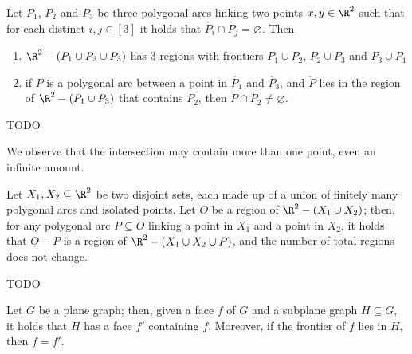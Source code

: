 \documentclass[a4paper, 12pt]{report}
\begin{document}
    \begin{framedlem}[label={3 poly arcs lemma}]{}
        Let $P_1$, $P_2$ and $P_3$ be three polygonal arcs linking two points $x, y \in \R^2$ such that for each distinct $i, j \in [3]$ it holds that $\mathring{P_i} \cap \mathring{P_j} = \varnothing$. Then
        
        \begin{enumerate}
            \item $\R^2 - (P_1 \cup P_2 \cup P_3)$ has 3 regions with frontiers $P_1 \cup P_2$, $P_2 \cup P_3$ and $P_3 \cup P_1$
            \item if $P$ is a polygonal arc between a point in $\mathring{P_1}$ and $\mathring{P_3}$, and $\mathring P$ lies in the region of $\R^2 - (P_1 \cup P_3)$ that contains $\mathring{P_2}$, then $\mathring{P} \cap \mathring{P_2} \neq \varnothing$.
        \end{enumerate}
    \end{framedlem}

    TODO 

    We observe that the intersection may contain more than one point, even an infinite amount.

    \begin{framedlem}[label={region lemma}]{}
        Let $X_1, X_2 \subseteq \R^2$ be two disjoint sets, each made up of a union of finitely many polygonal arcs and isolated points. Let $O$ be a region of $\R^2 - (X_1 \cup X_2)$; then, for any polygonal arc $P \subseteq O$ linking a point in $X_1$ and a point in $X_2$, it holds that $O - P$ is a region of $\R^2 - (X_1 \cup X_2 \cup P)$, and the number of total regions does not change.
    \end{framedlem}

    TODO 

    \begin{framedprop}[label={faces prop}]{}
        Let $G$ be a plane graph; then, given a face $f$ of $G$ and a subplane graph $H \subseteq G$, it holds that $H$ has a face $f'$ containing $f$. Moreover, if the frontier of $f$ lies in $H$, then $f = f'$.
    \end{framedprop}
\end{document}
